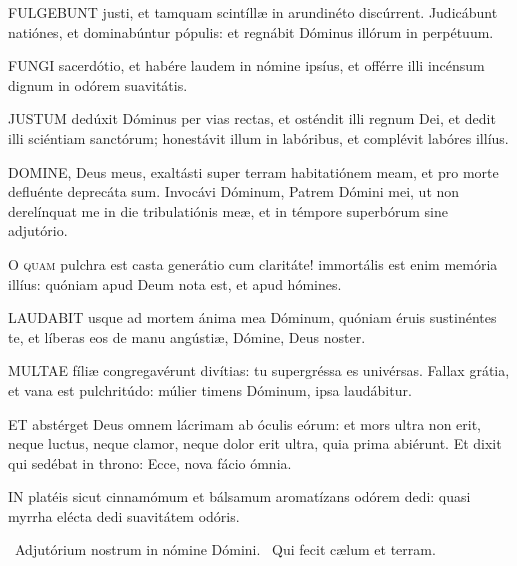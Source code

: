 \lettrine[lines=2]{F}{ULGEBUNT} justi, et tamquam scintíllæ in arundinéto discúrrent. Judicábunt natiónes, et dominabúntur pópulis: et regnábit Dóminus illórum in perpétuum.


\lettrine[lines=2]{F}{UNGI} sacerdótio, et habére laudem in nómine ipsíus, et offérre illi incénsum dignum in odórem suavitátis.


\lettrine[lines=2]{J}{USTUM} dedúxit Dóminus per vias rectas, et osténdit illi regnum Dei, et dedit illi sciéntiam sanctórum; honestávit illum in labóribus, et complévit labóres illíus.


\lettrine[lines=2]{D}{OMINE}, Deus meus, exaltásti super terram habitatiónem meam, et pro morte defluénte deprecáta sum. Invocávi Dóminum, Patrem Dómini mei, ut non derelínquat me in die tribulatiónis meæ, et in témpore superbórum sine adjutório.


\lettrine[lines=2]{O}{} \textsc{quam} pulchra est casta generátio cum claritáte! immortális est enim memória illíus: quóniam apud Deum nota est, et apud hómines.


\lettrine[lines=2]{L}{AUDABIT} usque ad mortem ánima mea Dóminum, quóniam éruis sustinéntes te, et líberas eos de manu angústiæ, Dómine, Deus noster.


\lettrine[lines=2]{M}{ULTAE} fíliæ congregavérunt divítias: tu supergréssa es univérsas. Fallax grátia, et vana est pulchritúdo: múlier timens Dóminum, ipsa laudábitur.


\lettrine[lines=2]{E}{T} abstérget Deus omnem lácrimam ab óculis eórum: et mors ultra non erit, neque luctus, neque clamor, neque dolor erit ultra, quia prima abiérunt. Et dixit qui sedébat in throno: Ecce, nova fácio ómnia.


\lettrine[lines=2]{I}{N} platéis sicut cinnamómum et bálsamum aromatízans odórem dedi: quasi myrrha elécta dedi suavitátem odóris.

\V\ Adjutórium nostrum in nómine Dómini. \R\ Qui fecit cælum et terram.

